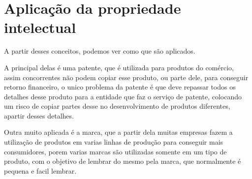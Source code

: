 \documentclass[12pt]{article}
\begin{document}
\section{Aplicação da propriedade intelectual} \label{sec:aplicacao}

A partir desses conceitos, podemos ver como que são aplicados.

A principal delas é uma patente, que é utilizada para produtos do comércio,
assim concorrentes não podem copiar esse produto, ou parte dele, para conseguir retorno
financeiro, o unico problema da patente é que deve repassar todos os detalhes desse produto
para a entidade que faz o serviço de patente, colocando um risco de copiar partes desse
no desenvolvimento de produtos diferentes, apartir desses detalhes.

Outra muito aplicada é a marca, que a partir dela muitas empresas fazem a utilização de
produtos em varias linhas de produção para conseguir mais consumidores, porem varias marcas
são utilizadas somente em um tipo de produto, com o objetivo de lembrar do mesmo pela marca,
que normalmente é pequena e facil lembrar.



 



\end{document}

